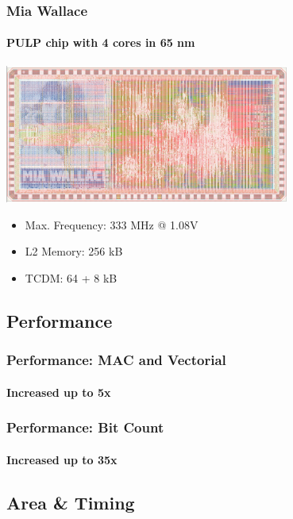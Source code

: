 \documentclass{beamer}
\begin{document}
\begin{frame}
\frametitle{Mia Wallace}
\framesubtitle{PULP chip with 4 cores in 65 nm}
  \vspace{15pt}
  \centering\includegraphics[width=0.7\textwidth]{figures/mia_wallace_layout_rev_sml}
  \vfill
  \begin{itemize}
    \item Max. Frequency: 333 MHz @ 1.08V
    \item L2 Memory: 256 kB
    \item TCDM: 64 + 8 kB
  \end{itemize}
  \vfill
\end{frame}


\subsection{Performance}

\begin{frame}
\frametitle{Performance: MAC and Vectorial}
\framesubtitle{Increased up to 5x}
  \vfill
    \centering
    
  \vfill
\end{frame}

\begin{frame}
\frametitle{Performance: Bit Count}
\framesubtitle{Increased up to 35x}
  \centering
  
\end{frame}


\subsection{Area \& Timing}
\end{document}
